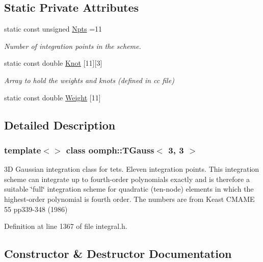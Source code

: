 \subsection*{Static Private Attributes}
\begin{DoxyCompactItemize}
\item 
static const unsigned \hyperlink{classoomph_1_1TGauss_3_013_00_013_01_4_a4580f87095e136688fa32b19ee08e5f8}{Npts} =11
\begin{DoxyCompactList}\small\item\em Number of integration points in the scheme. \end{DoxyCompactList}\item 
static const double \hyperlink{classoomph_1_1TGauss_3_013_00_013_01_4_a29f5170e8115a9b24fb5e0d31e769c4d}{Knot} \mbox{[}11\mbox{]}\mbox{[}3\mbox{]}
\begin{DoxyCompactList}\small\item\em Array to hold the weights and knots (defined in cc file) \end{DoxyCompactList}\item 
static const double \hyperlink{classoomph_1_1TGauss_3_013_00_013_01_4_ab779b1370485fc9e573fce744abfe9d4}{Weight} \mbox{[}11\mbox{]}
\end{DoxyCompactItemize}


\subsection{Detailed Description}
\subsubsection*{template$<$$>$\newline
class oomph\+::\+T\+Gauss$<$ 3, 3 $>$}

3D Gaussian integration class for tets. Eleven integration points. This integration scheme can integrate up to fourth-\/order polynomials exactly and is therefore a suitable \char`\"{}full\char`\"{} integration scheme for quadratic (ten-\/node) elements in which the highest-\/order polynomial is fourth order. The numbers are from Keast C\+M\+A\+ME 55 pp339-\/348 (1986) 

Definition at line 1367 of file integral.\+h.



\subsection{Constructor \& Destructor Documentation}
\mbox{\label{classoomph_1_1TGauss_3_013_00_013_01_4_a74d6c6a642d89312e86dc17784952426}} 
